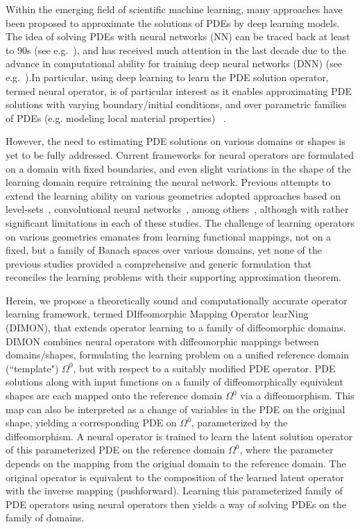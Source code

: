 \documentclass[review]{elsarticle}
\def\refd{0}
\def\Omegaref{{\Omega^\refd}}
\begin{document}
Within the emerging field of scientific machine learning, many approaches have been proposed to approximate the solutions of PDEs by deep learning models. The idea of solving PDEs with neural networks (NN) can be traced back at least to 90s (see e.g.~\cite{lagaris1998artificial,chen1995universal}), and has received much attention in the last decade due to the advance in computational ability for training deep neural networks (DNN) (see e.g.~\cite{karniadakis2021physics,raissi2019physics,yu2018deep,lu2021deepxde,cai2021physics}).In particular, using deep learning to learn the PDE solution operator, termed neural operator, is of particular interest as it enables approximating PDE solutions with varying boundary/initial conditions, and over parametric families of PDEs (e.g. modeling local material properties) ~\cite{lu2021learning,li2020fourier}. 

However, the need to estimating PDE solutions on various domains or shapes is yet to be fully addressed. Current frameworks for neural operators are formulated on a domain with fixed boundaries, and even slight variations in the shape of the learning domain require retraining the neural network. Previous attempts to extend the learning ability on various geometries adopted approaches based on level-sets~\cite{li2023geometry}, convolutional neural networks~\cite{he2023novel}, among others~\cite{li2022geoFNO}, although with rather significant limitations in each of these studies. The challenge of learning operators on various geometries emanates from learning functional mappings, not on a fixed, but a family of Banach spaces over various domains, yet none of the previous studies provided a comprehensive and generic formulation that reconciles the learning problems with their supporting approximation theorem.

Herein, we propose a theoretically sound and computationally accurate operator learning framework, termed DIffeomorphic Mapping Operator learNing (DIMON), that extends operator learning to a family of diffeomorphic domains. DIMON combines neural operators with diffeomorphic mappings between domains/shapes, formulating the learning problem on a unified reference domain (``template") $\Omegaref$, but with respect to a suitably modified PDE operator. PDE solutions along with input functions on a family of diffeomorphically equivalent shapes are each mapped onto the reference domain $\Omegaref$ via a diffeomorphism. This map can also be interpreted as a change of variables in the PDE on the original shape, yielding a corresponding PDE on $\Omegaref$, parameterized by the diffeomorphism. A neural operator is trained to learn the latent solution operator of this parameterized PDE on the reference domain $\Omegaref$, where the parameter depends on the mapping from the original domain to the reference domain. The original operator is equivalent to the composition of the learned latent operator with the inverse mapping (pushforward). Learning this parameterized family of PDE operators using neural operators then yields a way of solving PDEs on the family of domains. 
\end{document}
